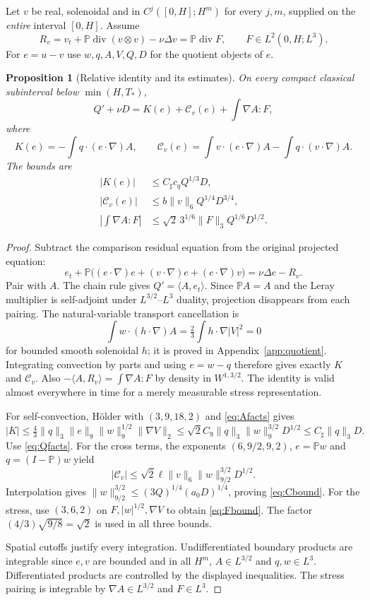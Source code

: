 \documentclass[11pt,a4paper]{article}
\newtheorem{proposition}[theorem]{Proposition}
\theoremstyle{definition}\newtheorem{definition}[theorem]{Definition}
\theoremstyle{remark}\newtheorem{remark}[theorem]{Remark}
\newcommand{\PP}{\mathbb P}
\newcommand{\norm}[1]{\lVert #1\rVert}
\newcommand{\ip}[2]{\langle #1,#2\rangle}
\newcommand{\diver}{\operatorname{div}}
\newcommand{\CS}{C_\sharp}
\numberwithin{equation}{section}
\begin{document}
Let $v$ be real, solenoidal and in $C^j([0,H];H^m)$ for every $j,m$, supplied on the \emph{entire} interval $[0,H]$. Assume
\begin{equation}\label{eq:comparison}
 R_v=v_t+\PP\diver(v\otimes v)-\nu\Delta v=\PP\diver F,
 \qquad F\in L^2(0,H;L^3).
\end{equation}
For $e=u-v$ use $w,q,A,V,Q,D$ for the quotient objects of $e$.

\begin{proposition}[Relative identity and its estimates]\label{prop:relative}
On every compact classical subinterval below $\min(H,T_*)$,
\begin{equation}\label{eq:relative}
 Q'+\nu D=K(e)+\mathcal C_v(e)+\int\nabla A:F,
\end{equation}
where
\[
 K(e)=-\int q\cdot(e\cdot\nabla)A,\qquad
 \mathcal C_v(e)=\int v\cdot(e\cdot\nabla)A-\int q\cdot(v\cdot\nabla)A.
\]
The bounds are
\begin{align}
 |K(e)|&\le\CS c_q Q^{1/3}D,\label{eq:Kbound}\\
 |\mathcal C_v(e)|&\le b\norm v_6Q^{1/4}D^{3/4},\label{eq:Cbound}\\
 \left|\int\nabla A:F\right|&\le\sqrt2\,3^{1/6}\norm F_3Q^{1/6}D^{1/2}.
 \label{eq:Fbound}
\end{align}
\end{proposition}
\begin{proof}
Subtract the comparison residual equation from the original projected equation:
\[
 e_t+\PP\bigl((e\cdot\nabla)e+(v\cdot\nabla)e+(e\cdot\nabla)v\bigr)
 =\nu\Delta e-R_v.
\]
Pair with $A$. The chain rule gives $Q'=\ip A{e_t}$. Since $\PP A=A$ and the Leray multiplier is self-adjoint under $L^{3/2}$--$L^3$ duality, projection disappears from each pairing. The natural-variable transport cancellation is
\[
 \int w\cdot(h\cdot\nabla)A=\tfrac23\int h\cdot\nabla|V|^2=0
\]
for bounded smooth solenoidal $h$; it is proved in Appendix~\ref{app:quotient}. Integrating convection by parts and using $e=w-q$ therefore gives exactly $K$ and $\mathcal C_v$. Also $-\ip A{R_v}=\int\nabla A:F$ by density in $W^{1,3/2}$. The identity is valid almost everywhere in time for a merely measurable stress representation.

For self-convection, H\"older with $(3,9,18,2)$ and \eqref{eq:Afacts} gives
\[
 |K|\le\tfrac43\norm q_3\norm e_9\norm w_9^{1/2}\norm{\nabla V}_2
 \le\sqrt2 C_9\norm q_3\norm w_9^{3/2}D^{1/2}
 \le\CS\norm q_3D.
\]
Use \eqref{eq:Qfacts}. For the cross terms, the exponents $(6,9/2,9,2)$, $e=\PP w$ and $q=(I-\PP)w$ yield
\[
 |\mathcal C_v|\le\sqrt2\ell\norm v_6\norm w_{9/2}^{3/2}D^{1/2}.
\]
Interpolation gives $\norm w_{9/2}^{3/2}\le(3Q)^{1/4}(a_0D)^{1/4}$, proving \eqref{eq:Cbound}. For the stress, use $(3,6,2)$ on $F,|w|^{1/2},\nabla V$ to obtain \eqref{eq:Fbound}. The factor $(4/3)\sqrt{9/8}=\sqrt2$ is used in all three bounds.

Spatial cutoffs justify every integration. Undifferentiated boundary products are integrable since $e,v$ are bounded and in all $H^m$, $A\in L^{3/2}$ and $q,w\in L^3$. Differentiated products are controlled by the displayed inequalities. The stress pairing is integrable by $\nabla A\in L^{3/2}$ and $F\in L^3$.
\end{proof}
\end{document}
